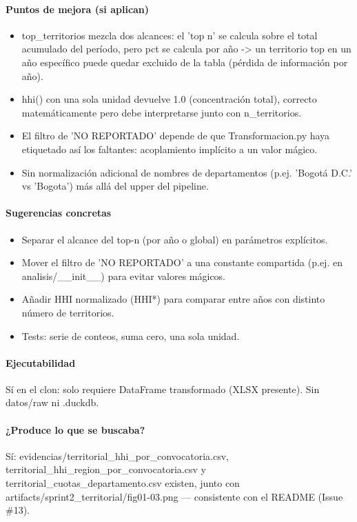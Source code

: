 \paragraph{Puntos de mejora (si aplican)}
\begin{itemize}
  \item top\_territorios mezcla dos alcances: el 'top n' se calcula sobre el total acumulado del período, pero pct se calcula por año -> un territorio top en un año específico puede quedar excluido de la tabla (pérdida de información por año).
  \item hhi() con una sola unidad devuelve 1.0 (concentración total), correcto matemáticamente pero debe interpretarse junto con n\_territorios.
  \item El filtro de 'NO REPORTADO' depende de que Transformacion.py haya etiquetado así los faltantes: acoplamiento implícito a un valor mágico.
  \item Sin normalización adicional de nombres de departamentos (p.ej. 'Bogotá D.C.' vs 'Bogota') más allá del upper del pipeline.
\end{itemize}

\paragraph{Sugerencias concretas}
\begin{itemize}
  \item Separar el alcance del top-n (por año o global) en parámetros explícitos.
  \item Mover el filtro de 'NO REPORTADO' a una constante compartida (p.ej. en analisis/\_\_init\_\_) para evitar valores mágicos.
  \item Añadir HHI normalizado (HHI*) para comparar entre años con distinto número de territorios.
  \item Tests: serie de conteos, suma cero, una sola unidad.
\end{itemize}

\paragraph{Ejecutabilidad}
Sí en el clon: solo requiere DataFrame transformado (XLSX presente). Sin datos/raw ni .duckdb.

\paragraph{¿Produce lo que se buscaba?}
Sí: evidencias/territorial\_hhi\_por\_convocatoria.csv, territorial\_hhi\_region\_por\_convocatoria.csv y territorial\_cuotas\_departamento.csv existen, junto con artifacts/sprint2\_territorial/fig01-03.png --- consistente con el README (Issue \#13).

